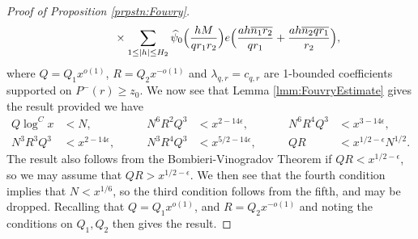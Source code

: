\documentclass[10pt]{amsart}
\theoremstyle{plain}
\numberwithin{equation}{section}
\renewcommand{\hat}[1]{\widehat #1}
\begin{document}
\begin{proof}[Proof of Proposition \ref{prpstn:Fouvry}]
\begin{align*}
&\qquad\qquad \times\sum_{1\le |h|\le H_2}\hat{\psi}_0\Bigl(\frac{h M}{q r_1 r_2}\Bigr)e\Bigl(\frac{ah\overline{n_1r_2}}{q r_1}+\frac{ah\overline{n_2 q r_1}}{r_2}\Bigr),
\end{align*}
where $Q=Q_1x^{o(1)}$, $R=Q_2x^{-o(1)}$ and $\lambda_{q,r}=c_{q,r}$ are 1-bounded coefficients supported on $P^-(r)\ge z_0$. We now see that Lemma \ref{lmm:FouvryEstimate} gives the result provided we have
\begin{align*}
Q\log^{C}{x}&<N,\qquad &N^6 R^2 Q^{3}&<x^{2-14\epsilon},\qquad &N^6 R^4 Q^{3}&<x^{3-14\epsilon},\\
N^{3}R^{3}Q^{3}&<x^{2-14\epsilon},\qquad &N^{3}R^{4}Q^{3}&<x^{5/2-14\epsilon},\qquad
&Q R&<x^{1/2-\epsilon}N^{1/2}.
\end{align*}
The result also follows from the Bombieri-Vinogradov Theorem if $QR<x^{1/2-\epsilon}$, so we may assume that $QR>x^{1/2-\epsilon}$. We then see that the fourth condition implies that $N<x^{1/6}$, so the third condition follows from the fifth, and may be dropped. Recalling that $Q=Q_1x^{o(1)}$, and $R=Q_2x^{-o(1)}$ and noting the conditions on $Q_1,Q_2$ then gives the result.
\end{proof}
%
%
%
%
%
%
%
%
%
%
%
%
%
%
%
%
%
%
\end{document}
